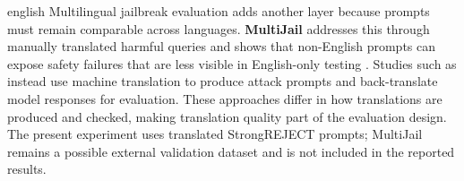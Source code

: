 \begin{otherlanguage*}{english}
Multilingual jailbreak evaluation adds another layer because prompts must remain comparable across languages. \textbf{MultiJail} addresses this through manually translated harmful queries and shows that non-English prompts can expose safety failures that are less visible in English-only testing \cite{dengMultilingualJailbreakChallenges2024}. Studies such as \textcite{yongLowResourceLanguagesJailbreak2023} instead use machine translation to produce attack prompts and back-translate model responses for evaluation. These approaches differ in how translations are produced and checked, making translation quality part of the evaluation design. The present experiment uses translated StrongREJECT prompts; MultiJail remains a possible external validation dataset and is not included in the reported results.

\newpage

\begin{landscape}

\begin{table}[h]


\end{table}
\end{landscape}
\end{otherlanguage*}
